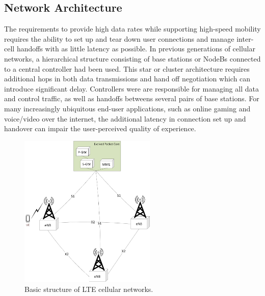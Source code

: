 \subsection{Network Architecture}
\label{net-arch}
The requirements to provide high data rates while supporting high-speed mobility requires the ability to set up and tear down user connections and manage inter-cell handoffs with as little latency as possible.  In previous generations of cellular networks, a hierarchical structure consisting of base stations or NodeBs connected to a central controller had been used.  This star or cluster architecture requires additional hops in both data transmissions and hand off negotiation which can introduce significant delay.  Controllers were are responsible for managing all data and control traffic, as well as handoffs betweens several pairs of base stations.  For many increasingly ubiquitous end-user applications, such as online gaming and voice/video over the internet, the additional latency in connection set up and handover can impair the user-perceived quality of experience.
\begin{figure}[!ht]
	\centering
	\includegraphics[width=0.58\textwidth]{figures3/lteAnet}
	\caption{Basic structure of LTE cellular networks.}
	\label{figs:LTE-A-Network}
\end{figure}

